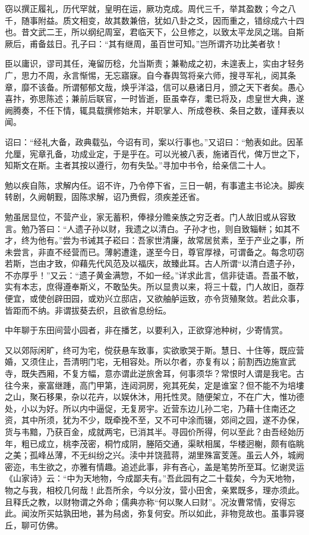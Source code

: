 \documentclass[12pt,UTF8]{ctexbook}
\begin{document}
窃以撰正履礼，历代罕就，皇明在运，厥功克成。周代三千，举其盈数；今之八千，随事附益。质文相变，故其数兼倍，犹如八卦之爻，因而重之，错综成六十四也。昔文武二王，所以纲纪周室，君临天下，公旦修之，以致太平龙凤之瑞。自斯厥后，甫备兹日。孔子曰：“其有继周，虽百世可知。”岂所谓齐功比美者欤！

臣以庸识，谬司其任，淹留历稔，允当斯责；兼勒成之初，未遑表上，实由才轻务广，思力不周，永言惭惕，无忘寤寐。自今春舆驾将亲六师，搜寻军礼，阅其条章，靡不该备。所谓郁郁文哉，焕乎洋溢，信可以悬诸日月，颁之天下者矣。愚心喜抃，弥思陈述；兼前后联官，一时皆逝，臣虽幸存，耄已将及，虑皇世大典，遂阙腾奏，不任下情，辄具载撰修始末，并职掌人、所成卷秩、条目之数，谨拜表以闻。

诏曰：“经礼大备，政典载弘，今诏有司，案以行事也。”又诏曰：“勉表如此。因革允厘，宪章孔备，功成业定，于是乎在。可以光被八表，施诸百代，俾万世之下，知斯文在斯。主者其按以遵行，勿有失坠。”寻加中书令，给亲信二十人。

勉以疾自陈，求解内任。诏不许，乃令停下省，三日一朝，有事遣主书论决。脚疾转剧，久阙朝觐，固陈求解，诏乃赉假，须疾差还省。

勉虽居显位，不营产业，家无蓄积，俸禄分赡亲族之穷乏者。门人故旧或从容致言。勉乃答曰：“人遗子孙以财，我遗之以清白。子孙才也，则自致辎軿；如其不才，终为他有。”尝为书诫其子崧曰：吾家世清廉，故常居贫素，至于产业之事，所未尝言，非直不经营而已。薄躬遭逢，遂至今日，尊官厚禄，可谓备之。每念叨窃若斯，岂由才致，仰藉先代风范及以福庆，故臻此耳。古人所谓“以清白遗子孙，不亦厚乎！”又云：“遗子黄金满惣，不如一经。”详求此言，信非徒语。吾虽不敏，实有本志，庶得遵奉斯义，不敢坠失。所以显贵以来，将三十载，门人故旧，亟荐便宜，或使创辟田园，或劝兴立邸店，又欲舳舻运致，亦令货殖聚敛。若此众事，皆距而不纳。非谓拔葵去织，且欲省息纷纭。

中年聊于东田间营小园者，非在播艺，以要利入，正欲穿池种树，少寄情赏。

又以郊际闲旷，终可为宅，傥获悬车致事，实欲歌哭于斯。慧日、十住等，既应营婚，又须住止，吾清明门宅，无相容处。所以尔者，亦复有以；前割西边施宣武寺，既失西厢，不复方幅，意亦谓此逆旅舍耳，何事须华？常恨时人谓是我宅。古往今来，豪富继踵，高门甲第，连闼洞房，宛其死矣，定是谁室？但不能不为培塿之山，聚石移果，杂以花卉，以娱休沐，用托性灵。随便架立，不在广大，惟功德处，小以为好。所以内中逼促，无复房宇。近营东边儿孙二宅，乃藉十住南还之资，其中所须，犹为不少，既牵挽不至，又不可中涂而辍，郊间之园，遂不办保，货与韦黯，乃获百金，成就两宅，已消其半。寻园价所得，何以至此？由吾经始历年，粗已成立，桃李茂密，桐竹成阴，塍陌交通，渠畎相属，华楼迥榭，颇有临眺之美；孤峰丛薄，不无纠纷之兴。渎中并饶菰蒋，湖里殊富芰莲。虽云人外，城阙密迩，韦生欲之，亦雅有情趣。追述此事，非有吝心，盖是笔势所至耳。忆谢灵运《山家诗》云：“中为天地物，今成鄙夫有。”吾此园有之二十载矣，今为天地物，物之与我，相校几何哉！此吾所余，今以分汝，营小田舍，亲累既多，理亦须此。且释氏之教，以财物谓之外命；儒典亦称“何以聚人曰财”。况汝曹常情，安得忘此。闻汝所买姑孰田地，甚为舄卤，弥复何安。所以如此，非物竞故也。虽事异寝丘，聊可仿佛。
\end{document}
